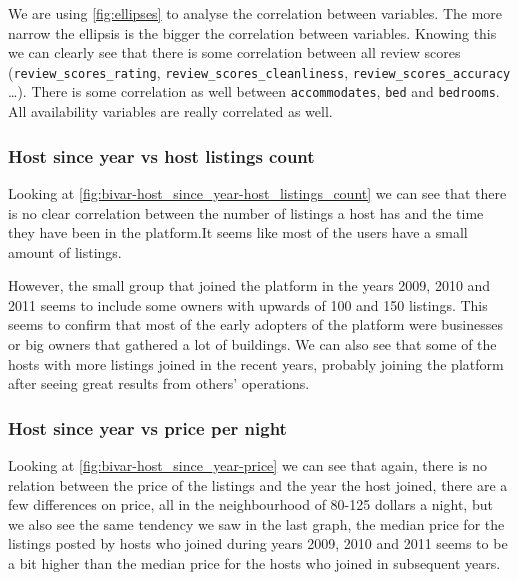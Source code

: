 We are using \cref{fig:ellipses} to analyse the correlation between variables.
The more narrow the ellipsis is the bigger the correlation between variables.
Knowing this we can clearly see that there is some correlation between all
review scores (\texttt{review\_scores\_rating},
\texttt{review\_scores\_cleanliness}, \texttt{review\_scores\_accuracy} \dots).
There is some correlation as well between \texttt{accommodates}, \texttt{bed} and
\texttt{bedrooms}. All availability variables are really correlated as well.
\subsubsection{Host since year vs host listings count}




Looking at \cref{fig:bivar-host_since_year-host_listings_count} we can see that
there is no clear correlation between the number of listings a host has and the
time they have been in the platform.It seems like most of the users have a small
amount of listings.

However, the small group that joined the platform in the years 2009, 2010 and
2011 seems to include some owners with upwards of 100 and 150 listings. This
seems to confirm that most of the early adopters of the platform were businesses
or big owners that gathered a lot of buildings. We can also see that some of the
hosts with more listings joined in the recent years, probably joining the
platform after seeing great results from others' operations.


\pagebreak
\subsubsection{Host since year vs price per night}


Looking at \cref{fig:bivar-host_since_year-price} we can see that again, there
is no relation between the price of the listings and the year the host joined,
there are a few differences on price, all in the neighbourhood of 80-125 dollars
a night, but we also see the same tendency we saw in the last graph, the median
price for the listings posted by hosts who joined during years 2009, 2010 and
2011 seems to be a bit higher than the median price for the hosts who joined in
subsequent years.

